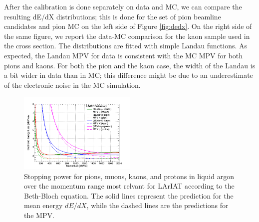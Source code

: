 After the calibration is done separately on data and MC, we can compare the resulting dE/dX distributions; this is done for the set of pion beamline candidates and pion MC on the left side of Figure \ref{fig:dedx}. On the right side of the same figure, we report the data-MC comparison for the kaon sample used in the cross section. The distributions are fitted with simple Landau functions. As expected, the Landau MPV for data  is consistent with the MC MPV for both pions and kaons. For both the pion and the kaon case, the width of the Landau is a bit wider in data than in MC; this difference might be due to an underestimate of the electronic noise in the MC simulation.


\begin{figure}[htb]
\centering
\includegraphics[width=0.50\textwidth]{Chapter-5/Images/dEdXvsMomentumTemplate.png}
\caption{Stopping power for pions, muons, kaons, and protons in liquid argon over the momentum range most relvant for LArIAT according to the Beth-Bloch equation. The solid lines represent the prediction for the mean energy $dE/dX$, while the dashed lines are the predictions for the MPV.}
\label{fig:PDGEnergyLossArgon}
\end{figure}


